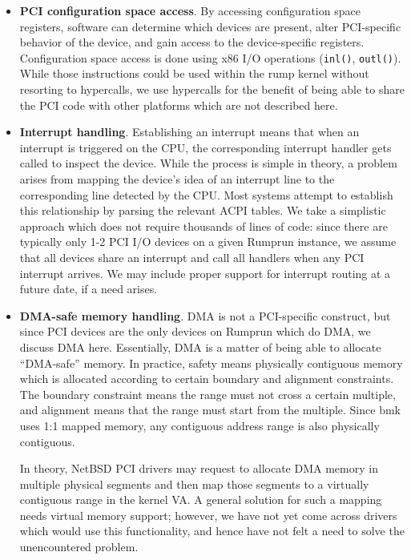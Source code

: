 \begin{itemize}

\item	\textbf{PCI configuration space access}.  By accessing
	configuration space registers, software can determine which
	devices are present, alter PCI-specific behavior of the
	device, and gain access to the device-specific registers.
	Configuration space access is done using x86 I/O operations
	(\texttt{inl()}, \texttt{outl()}).  While those instructions
	could be used within the rump kernel without resorting to
	hypercalls, we use hypercalls for the benefit of being able
	to share the PCI code with other platforms which are not
	described here.

\item	\textbf{Interrupt handling}.  Establishing an interrupt
	means that when an interrupt is triggered on the CPU,
	the corresponding interrupt handler gets called to inspect
	the device.  While the process is simple in theory, a problem
	arises from mapping the device's idea of an interrupt line to the
	corresponding line detected by the CPU.  Most systems attempt to
	establish this relationship by parsing the relevant ACPI tables.
	We take a simplistic approach which does not require thousands
	of lines of code: since there are typically only 1-2 PCI I/O
	devices on a given Rumprun instance, we assume that all devices
	share an interrupt and call all handlers when any PCI interrupt
	arrives.  We may include proper support for interrupt routing
	at a future date, if a need arises.

\item	\textbf{DMA-safe memory handling}.  DMA is not a PCI-specific
	construct, but since PCI devices are the only devices on Rumprun
	which do DMA, we discuss DMA here.  Essentially, DMA is a matter
	of being able to allocate ``DMA-safe'' memory.  In practice,
	safety means physically contiguous memory which is allocated
	according to certain boundary and alignment constraints.
	The boundary constraint means the range must not cross a certain
	multiple, and alignment means that the range must start from
	the multiple.  Since bmk uses 1:1 mapped memory, any contiguous
	address range is also physically contiguous.

	In theory, NetBSD
	PCI drivers may request to allocate DMA memory in multiple
	physical segments and then map those segments to a virtually
	contiguous range in the kernel VA.  A general solution for such
	a mapping needs virtual memory support; however, we have not yet
	come across drivers which would use this functionality, and hence
	have not felt a need to solve the unencountered problem.
\end{itemize}


